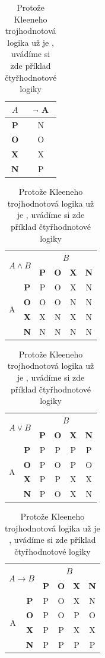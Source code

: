 \documentclass[11pt,a4paper]{article}
\begin{document}
\begin{table}[hb]
    \centering
    \begin{tabular}{|c|c|}
    \hline
    $A$ & $\neg$ A \\
    \hline
    \textbf{P} & N\\
    \hline
    \textbf{O} & O\\
    \hline
    \textbf{X} & X\\
    \hline
    \textbf{N} & P\\
    \hline
    \end{tabular}
    \begin{tabular}{|c|c|c|c|c|c|}
    \hline
    \multicolumn{2}{|c|}{\multirow{2}{*}{$A \wedge B$}}& \multicolumn{4}{c|}{$B$}\\
    \cline{3-6}
    \multicolumn{2}{|c|}{}&\textbf{P} & \textbf{O}&\textbf{X}&\textbf{N}\\
    \hline
    \multirow{4}{*}{A} & \textbf{P} & P & O & X & N\\
    \cline{2-6}
    &\textbf{O} & O & O & N & N\\
    \cline{2-6}
    &\textbf{X} & X & N & X & N\\
    \cline{2-6}
    &\textbf{N} & N & N & N & N\\
    \hline
    \end{tabular}
    \begin{tabular}{|c|c|c|c|c|c|}
    \hline
    \multicolumn{2}{|c|}{\multirow{2}{*}{$A \vee B$}}& \multicolumn{4}{c|}{$B$}\\
    \cline{3-6}
    \multicolumn{2}{|c|}{}&\textbf{P} & \textbf{O}&\textbf{X}&\textbf{N}\\
    \hline
    \multirow{4}{*}{A} & \textbf{P} & P & P & P & P\\
    \cline{2-6}
    &\textbf{O} & P & O & P & O\\
    \cline{2-6}
    &\textbf{X} & P & P & X & X\\
    \cline{2-6}
    &\textbf{N} & P & O & X & N\\
    \hline
    \end{tabular}
    \begin{tabular}{|c|c|c|c|c|c|}
    \hline
    \multicolumn{2}{|c|}{\multirow{2}{*}{$A \rightarrow B$}}& \multicolumn{4}{c|}{$B$}\\
    \cline{3-6}
    \multicolumn{2}{|c|}{}&\textbf{P} & \textbf{O}&\textbf{X}&\textbf{N}\\
    \hline
    \multirow{4}{*}{A} & \textbf{P} & P & O & X & N\\
    \cline{2-6}
    &\textbf{O} & P & O & P & O\\
    \cline{2-6}
    &\textbf{X} & P & P & X & X\\
    \cline{2-6}
    &\textbf{N} & P & P & P & P\\
    \hline
    \end{tabular}
    
    \caption{Protože Kleeneho trojhodnotová logika už je , uvádíme si zde příklad čtyřhodnotové logiky}
    \label{tab:logic}
\end{table}
\pagebreak
\end{document}
